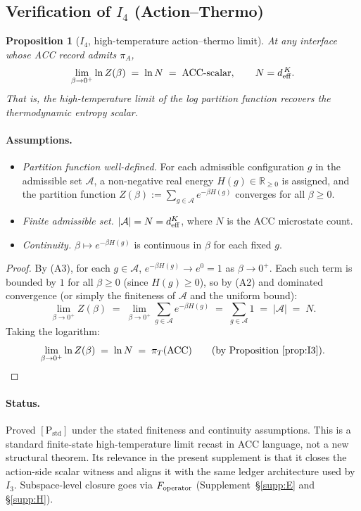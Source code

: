 \documentclass[11pt]{article}
\theoremstyle{plain}
\newtheorem{proposition}[theorem]{Proposition}
\theoremstyle{definition}
\theoremstyle{remark}
\begin{document}
\subsection{Verification of \texorpdfstring{$I_4$}{I4} (Action--Thermo)}\label{supp:D4}

\begin{proposition}[$I_4$, high-temperature action--thermo limit]\label{prop:I4}
At any interface whose ACC record admits $\pi_A$,
\[
  \lim_{\beta \to 0^+} \ln Z(\beta) \;=\; \ln N \;=\; \mathrm{ACC}\text{-scalar},
  \qquad
  N = d_{\rm eff}^{\,K}.
\]
That is, the high-temperature limit of the log partition function recovers the thermodynamic entropy scalar.
\end{proposition}

\paragraph{Assumptions.}
\begin{itemize}[leftmargin=2em,itemsep=2pt]
  \item[\textbf{(A1)}] \emph{Partition function well-defined.} For each admissible configuration $g$ in the admissible set $\mathcal{A}$, a non-negative real energy $H(g) \in \mathbb{R}_{\geq 0}$ is assigned, and the partition function $Z(\beta) := \sum_{g \in \mathcal{A}} e^{-\beta H(g)}$ converges for all $\beta \geq 0$.
  \item[\textbf{(A2)}] \emph{Finite admissible set.} $|\mathcal{A}| = N = d_{\rm eff}^K$, where $N$ is the ACC microstate count.
  \item[\textbf{(A3)}] \emph{Continuity.} $\beta \mapsto e^{-\beta H(g)}$ is continuous in $\beta$ for each fixed $g$.
\end{itemize}

\begin{proof}
By (A3), for each $g \in \mathcal{A}$, $e^{-\beta H(g)} \to e^{0} = 1$ as $\beta \to 0^+$.  Each such term is bounded by $1$ for all $\beta \geq 0$ (since $H(g) \geq 0$), so by (A2) and dominated convergence (or simply the finiteness of $\mathcal{A}$ and the uniform bound):
\[
  \lim_{\beta \to 0^+} Z(\beta)
  \;=\; \lim_{\beta \to 0^+} \sum_{g \in \mathcal{A}} e^{-\beta H(g)}
  \;=\; \sum_{g \in \mathcal{A}} 1
  \;=\; |\mathcal{A}| \;=\; N.
\]
Taking the logarithm:
\[
  \lim_{\beta \to 0^+} \ln Z(\beta) \;=\; \ln N \;=\; \pi_T(\mathrm{ACC}) \qquad \text{(by Proposition~\ref{prop:I3}).}
\]
\end{proof}

\paragraph{Status.}
Proved $[\text{P}_{\mathrm{std}}]$ under the stated finiteness and continuity assumptions.  This is a standard finite-state high-temperature limit recast in ACC language, not a new structural theorem.  Its relevance in the present supplement is that it closes the action-side scalar witness and aligns it with the same ledger architecture used by $I_3$.  Subspace-level closure goes via $F_{\rm operator}$ (Supplement~\S\ref{supp:E} and \S\ref{supp:H}).
\end{document}
